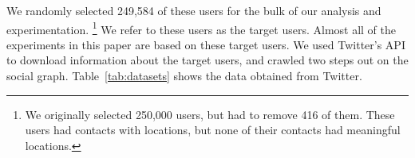 \documentclass[letterpaper]{article}
\begin{document}
%

We randomly selected 249,584 of these users for the bulk of our analysis and
experimentation.
\ifdefined\THESIS
\footnote{We originally selected 250,000 users, but had to remove 416 of them.
These users had contacts with locations, but none of their contacts had
meaningful locations.}
\fi
%
We refer to these users as the target users.
%
Almost all of the experiments in this paper are based on these target
users.
%
We used Twitter's API to download information about the target users, and
crawled two steps out on the social graph.
%
Table~\ref{tab:datasets} shows the data obtained from Twitter.


\end{document}
